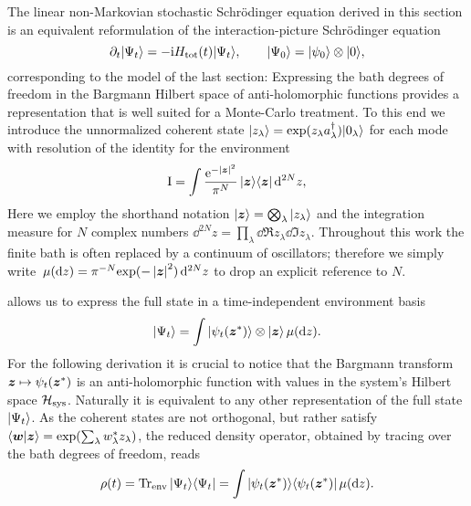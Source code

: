 The linear non-Markovian stochastic Schrödinger equation derived in this section is an equivalent reformulation of the interaction-picture Schrödinger equation
\begin{equation}
  \partial_t | \Psi_t \rangle = -\mathrm{i} H_\mathrm{tot}(t) | \Psi_t \rangle, \qquad | \Psi_0 \rangle = | \psi_0 \rangle \otimes | 0 \rangle,
  \label{eq:nmqsd.schroedinger_ia}
\end{equation}
corresponding to the model of the last section:
Expressing the bath degrees of freedom in the Bargmann Hilbert space of anti-holomorphic functions\cite{Ba61_coherent_states} provides a representation that is well suited for a Monte-Carlo treatment.
To this end we introduce the unnormalized coherent state $\ket{z_\lambda} = \exp(z_\lambda \adj{a}_\lambda)\ket{0_\lambda}$ for each mode with resolution of the identity for the environment
\begin{equation}
  \unit = \int \frac{\exp[-\abs{\zz}^2]}{\pi^N} \, \ket{\zz}\bra{\zz} \dd^{2N}z,
  \label{eq:nmqsd.identity}
\end{equation}
Here we employ the shorthand notation $| \boldsymbol{z} \rangle = \bigotimes_\lambda | z_\lambda \rangle$ and the  integration measure for $N$ complex numbers $\dd^{2N}z = \prod_\lambda \dd\Re z_\lambda \dd\Im z_\lambda$.
Throughout this work the finite bath is often replaced by a continuum of oscillators; therefore we simply write $\mudz = \pi^{-N} \exp(-\abs{\vec z}^2) \dd^{2N}z$ to drop an explicit reference to $N$.

 allows us to express the full state in a time-independent environment basis
\begin{equation*}
  | \Psi_t \rangle = \int | \psi_t({\boldsymbol{z}}^*) \rangle \otimes | \boldsymbol{z} \rangle \, \mu(\mathrm{d} z).
\end{equation*}
For the following derivation it is crucial to notice that the Bargmann transform $\boldsymbol{z} \mapsto \psi_t({\boldsymbol{z}}^*)$ is an anti-holomorphic function with values in the system's Hilbert space $\mathcal{H}_\mathrm{sys}$.
Naturally it is equivalent to any other representation of the full state $| \Psi_t \rangle$.
As the coherent states are not orthogonal, but rather satisfy $\braket{\vec w}{\vec z} = \exp(\sum_\lambda \cc w_\lambda z_\lambda)$, the reduced density operator, obtained by tracing over the bath degrees of freedom, reads
\begin{equation}
  \rho(t) = \operatorname{Tr}_\mathrm{env} | \Psi_t \rangle\langle \Psi_t |
          = \int | \psi_t({\boldsymbol{z}}^*) \rangle\langle \psi_t({\boldsymbol{z}}^*) | \, \mu(\mathrm{d} z).
  \label{eq:nmqsd.reduced_matrix}
\end{equation}

